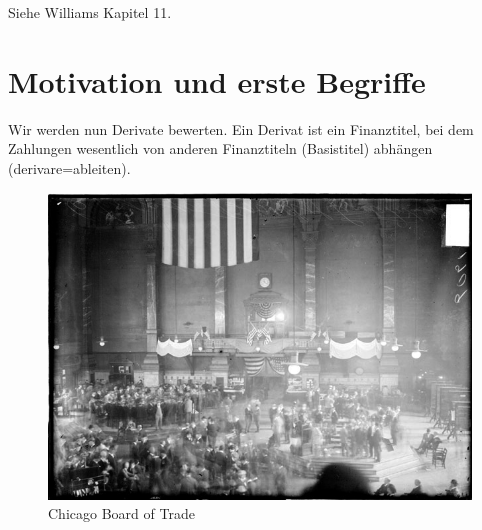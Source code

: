 \documentclass[a4paper,twoside,DIV15,BCOR12mm]{scrbook}
\begin{document}
\begin{beweis}
Siehe Williams Kapitel 11.
\end{beweis}

\section{Motivation und erste Begriffe}
Wir werden nun Derivate bewerten. Ein Derivat ist ein Finanztitel, bei dem Zahlungen wesentlich von anderen Finanztiteln (Basistitel) abhängen (derivare=ableiten).

\begin{figure}
\begin{center}
\includegraphics[width=0.9\linewidth]{CBOT.jpg}
\end{center}
\caption{Chicago Board of Trade}
\end{figure}
\end{document}
